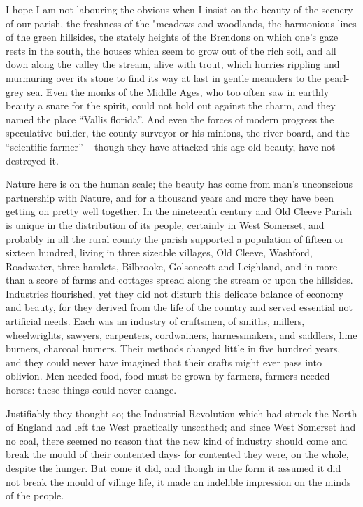 I hope I am not labouring the obvious when I insist on the beauty of the scenery of our parish, the freshness of the "meadows and woodlands, the harmonious lines of the green hillsides, the stately heights of the Brendons on which one's gaze rests in the south, the houses which seem to grow out of the rich soil, and all down along the valley the stream, alive with trout, which hurries rippling and murmuring over its stone to find its way at last in gentle meanders to the pearl-grey sea. Even the monks of the Middle Ages, who too often saw in earthly beauty a snare for the spirit, could not hold out against the charm, and they named the place “Vallis florida”. And even the forces of modern progress the speculative builder, the county surveyor or his minions, the river board, and the “scientific farmer” – though they have attacked this age-old beauty, have not destroyed it. 

Nature here is on the human scale; the beauty has come from man's unconscious partnership with Nature, and for a thousand years and more they have been getting on pretty well together. In the nineteenth century and Old Cleeve Parish is unique in the distribution of its people, certainly in West Somerset, and probably in all the rural county the parish supported a population of fifteen or sixteen hundred, living in three sizeable villages, Old Cleeve, Washford, Roadwater, three hamlets, Bilbrooke, Golsoncott and Leighland, and in more than a score of farms and cottages spread along the stream or upon the hillsides. Industries flourished, yet they did not disturb this delicate balance of economy and beauty, for they derived from the life of the country and served essential not artificial needs. Each was an industry of craftsmen, of smiths, millers, wheelwrights, sawyers, carpenters, cordwainers, harnessmakers, and saddlers, lime burners, charcoal burners. Their methods changed little in five hundred years, and they could never have imagined that their crafts might ever pass into oblivion. Men needed food, food must be grown by farmers, farmers needed horses: these things could never change.

Justifiably they thought so; the Industrial Revolution which had struck the North of England had left the West practically unscathed; and since West Somerset had no coal, there seemed no reason that the new kind of industry should come and break the mould of their contented days- for contented they were, on the whole, despite the hunger. But come it did, and though in the form it assumed it did not break the mould of village life, it made an indelible impression on the minds of the people. 

